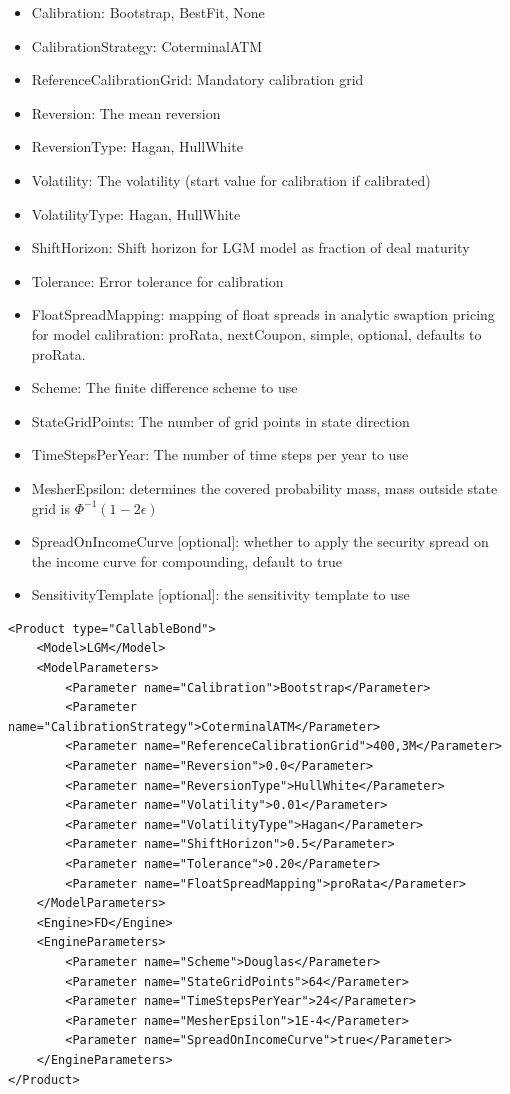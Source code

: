 \begin{itemize}
\item Calibration: Bootstrap, BestFit, None
\item CalibrationStrategy: CoterminalATM
\item ReferenceCalibrationGrid: Mandatory calibration grid
\item Reversion: The mean reversion
\item ReversionType: Hagan, HullWhite
\item Volatility: The volatility (start value for calibration if calibrated)
\item VolatilityType: Hagan, HullWhite
\item ShiftHorizon: Shift horizon for LGM model as fraction of deal maturity
\item Tolerance: Error tolerance for calibration
\item FloatSpreadMapping: mapping of float spreads in analytic swaption pricing for model calibration: proRata,
  nextCoupon, simple, optional, defaults to proRata.
\item Scheme: The finite difference scheme to use
\item StateGridPoints: The number of grid points in state direction
\item TimeStepsPerYear: The number of time steps per year to use
\item MesherEpsilon: determines the covered probability mass, mass outside state grid is $\Phi^{-1}(1-2\epsilon)$
\item SpreadOnIncomeCurve [optional]: whether to apply the security spread on the income curve for compounding, default to true
\item SensitivityTemplate [optional]: the sensitivity template to use
\end{itemize}

\begin{longlisting}
\begin{verbatim}
<Product type="CallableBond">
    <Model>LGM</Model>
    <ModelParameters>
        <Parameter name="Calibration">Bootstrap</Parameter>
        <Parameter name="CalibrationStrategy">CoterminalATM</Parameter>
        <Parameter name="ReferenceCalibrationGrid">400,3M</Parameter>
        <Parameter name="Reversion">0.0</Parameter>
        <Parameter name="ReversionType">HullWhite</Parameter>
        <Parameter name="Volatility">0.01</Parameter>
        <Parameter name="VolatilityType">Hagan</Parameter>
        <Parameter name="ShiftHorizon">0.5</Parameter>
        <Parameter name="Tolerance">0.20</Parameter>
        <Parameter name="FloatSpreadMapping">proRata</Parameter>
    </ModelParameters>
    <Engine>FD</Engine>
    <EngineParameters>
        <Parameter name="Scheme">Douglas</Parameter>
        <Parameter name="StateGridPoints">64</Parameter>
        <Parameter name="TimeStepsPerYear">24</Parameter>
        <Parameter name="MesherEpsilon">1E-4</Parameter>
        <Parameter name="SpreadOnIncomeCurve">true</Parameter>
    </EngineParameters>
</Product>
\end{verbatim}
\caption{Configuration for Product CallableBond, Model LGM, Engine FD}
\label{lst:peconfig_CallableBond_LGM_FD}
\end{longlisting}

